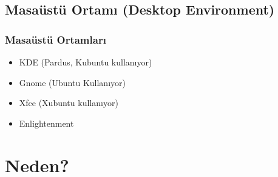 \documentclass{beamer}
\begin{document}
	\subsection{Masaüstü Ortamı (Desktop Environment)}
		\begin{frame}
		 	\frametitle{Masaüstü Ortamları}
				\begin{itemize}
				 \item KDE (Pardus, Kubuntu kullanıyor)
				 \item Gnome (Ubuntu Kullanıyor)
				 \item Xfce (Xubuntu kullanıyor)
				 \item Enlightenment
				\end{itemize}

		\end{frame}
 

\section{Neden?}
\end{document}
